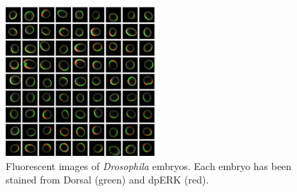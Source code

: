 \documentclass{pnastwo}
\begin{document}
\begin{figure}
\includegraphics[width=0.5\textwidth]{unregistered_unordered_2d}
\caption{Fluorescent images of {\em Drosophila} embryos. Each embryo has been stained from Dorsal (green) and dpERK (red).}
\label{fig:fluorescent_images}
\end{figure}
\end{document}
